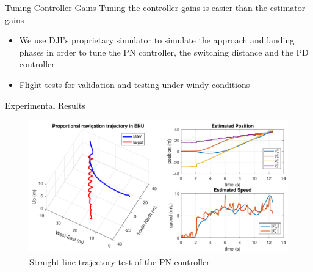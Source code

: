 
%		


\begin{frame}{Tuning Controller Gains}
	Tuning the controller gains is easier than the estimator gains
	\begin{itemize}
		\item We use DJI's proprietary simulator to simulate the approach and landing phases in order to tune
		the PN controller, the switching distance and the PD controller
		\vspace{0.5cm}
		\item Flight tests for validation and testing under windy conditions
	\end{itemize}
\end{frame}



\begin{frame}{Experimental Results}
	\begin{figure}
		\includegraphics[width=0.8\paperwidth]{figures/pn.pdf} \\
		Straight line trajectory test of the PN controller%
	\end{figure}
\end{frame}

